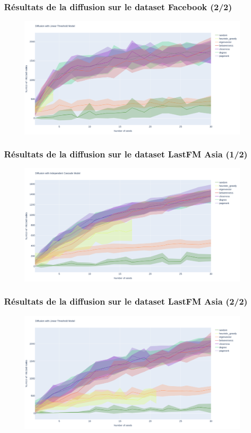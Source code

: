 \documentclass[11pt]{beamer}
\begin{document}
	\begin{frame}
		\frametitle{Résultats de la diffusion sur le dataset Facebook (2/2)}
		\begin{figure}
			\centering
			\includegraphics[width=\textwidth, height=0.8\textheight]{./images/facebook_ltm.png}
		\end{figure}
	\end{frame}
	\begin{frame}
		\frametitle{Résultats de la diffusion sur le dataset LastFM Asia (1/2)}
		\begin{figure}
			\centering
			\includegraphics[width=\textwidth, height=0.8\textheight]{./images/lastfm_icm.png}
		\end{figure}
	\end{frame}
	\begin{frame}
		\frametitle{Résultats de la diffusion sur le dataset LastFM Asia (2/2)}
		\begin{figure}
			\centering
			\includegraphics[width=\textwidth, height=0.8\textheight]{./images/lastfm_ltm.png}
		\end{figure}
	\end{frame}
	
\end{document}

